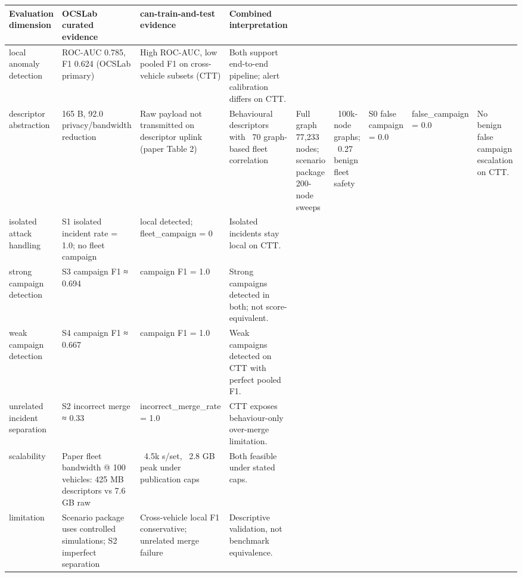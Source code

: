 \begin{tabular}{llll}
\toprule
Evaluation dimension & OCSLab curated evidence & can-train-and-test evidence & Combined interpretation \\
\midrule
local anomaly detection & ROC-AUC 0.785, F1 0.624 (OCSLab primary) & High ROC-AUC, low pooled F1 on cross-vehicle subsets (CTT) & Both support end-to-end pipeline; alert calibration differs on CTT. \\
descriptor abstraction & 165 B, 92.0%
privacy/bandwidth reduction & Raw payload not transmitted on descriptor uplink (paper Table 2) & Behavioural descriptors with ~70%
graph-based fleet correlation & Full graph 77,233 nodes; scenario package 200-node sweeps & ~100k-node graphs; ~0.27%
benign fleet safety & S0 false campaign = 0.0 & false_campaign = 0.0 & No benign false campaign escalation on CTT. \\
isolated attack handling & S1 isolated incident rate = 1.0; no fleet campaign & local detected; fleet_campaign = 0 & Isolated incidents stay local on CTT. \\
strong campaign detection & S3 campaign F1 ≈ 0.694 & campaign F1 = 1.0 & Strong campaigns detected in both; not score-equivalent. \\
weak campaign detection & S4 campaign F1 ≈ 0.667 & campaign F1 = 1.0 & Weak campaigns detected on CTT with perfect pooled F1. \\
unrelated incident separation & S2 incorrect merge ≈ 0.33 & incorrect_merge_rate = 1.0 & CTT exposes behaviour-only over-merge limitation. \\
scalability & Paper fleet bandwidth @ 100 vehicles: 425 MB descriptors vs 7.6 GB raw & ~4.5k s/set, ~2.8 GB peak under publication caps & Both feasible under stated caps. \\
limitation & Scenario package uses controlled simulations; S2 imperfect separation & Cross-vehicle local F1 conservative; unrelated merge failure & Descriptive validation, not benchmark equivalence. \\
\bottomrule
\end{tabular}
